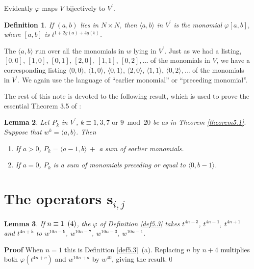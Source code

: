 \documentclass{monsky2009}
\newenvironment{proof}[1][]{\textbf{Proof #1\hspace{.3em}}}{}
\newtheorem{definition}{Definition}[section]
\newtheorem{lemma}[definition]{Lemma}
\newcommand{\mod}[1]{\ensuremath{\hspace{.5em}(#1)}}
\begin{document}
Evidently $\varphi$ maps $V$ bijectively to $V^{\prime}$.

\begin{definition}
\label{def5.4}
If $(a,b)$ lies in $N\times N$, then $\langle a,b\rangle$ in $V^{\prime}$ is the monomial $\varphi[a,b]$, where $[a,b]$ is $t^{1+2g(a)+4g(b)}$.
\end{definition}

The $\langle a,b\rangle$  run over all the monomials in $w$ lying in $V^{\prime}$. Just as we had a listing, $[0,0]$, $[1,0]$, $[0,1]$, $[2,0]$, $[1,1]$, $[0,2], \ldots$ of the monomials in $V$, we have a corresponding listing $\langle 0,0\rangle $, $\langle 1,0\rangle $, $\langle 0,1\rangle $, $\langle 2,0\rangle $, $\langle 1,1\rangle $, $\langle 0,2\rangle , \ldots$ of the monomials in $V^{\prime}$.  We again use the language of ``earlier monomial'' or ``preceding monomial''.

The rest of this note is devoted to the following result, which is used to prove the essential Theorem 3.5 of \cite{4}:
\pagebreak

\begin{lemma}%
\label{lemma5.5}
Let $P_{k}$ in $V^{\prime}$, $k \equiv 1,3,7 \mbox{ or } 9\bmod{20}$ be as in Theorem \ref{theorem5.1}. Suppose that $w^{k}=\langle a,b\rangle$. Then
\begin{enumerate}
\item[(1)] If $a>0$, $P_{k}=\langle a-1,b\rangle\ +$ a sum of earlier monomials.
\item[(2)] If $a=0$, $P_{k}$ is a sum of monomials preceding or equal to $\langle 0,b-1\rangle$.
\end{enumerate}
\end{lemma}

\section{The operators $\bm s_{i,j}$}
\label{section6}

\begin{lemma}%
\label{lemma6.1}
If $n\equiv 1\mod{4}$, the $\varphi$ of Definition \ref{def5.3} takes $t^{4n-3}$, $t^{4n-1}$, $t^{4n+1}$ and $t^{4n+5}$ to $w^{10n-9}$, $w^{10n-7}$, $w^{10n-3}$, $w^{10n-1}$.
\end{lemma}

\begin{proof}
When $n=1$ this is Definition \ref{def5.3}~(a). Replacing $n$ by $n+4$ multiplies both $\varphi(t^{4n+c})$ and $w^{10n+d}$ by $w^{40}$, giving the result.\qed
\end{proof}
\end{document}
